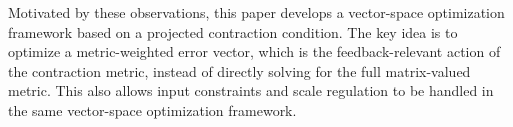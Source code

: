 \documentclass{ifacconf}
\newcommand{\ctxt}[2]{{\color{#1}{#2}\color{black}}}
\newcommand{\cred}[1]{{\ctxt{awesome}{#1}}}
\begin{document}


Motivated by these observations, this paper develops a vector-space optimization framework based on a projected contraction condition.
The key idea is to optimize a metric-weighted error vector, which is the feedback-relevant action of the contraction metric, instead of directly solving for the full matrix-valued metric.
This also allows input constraints and scale regulation to be handled in the same vector-space optimization framework.

\end{document}
